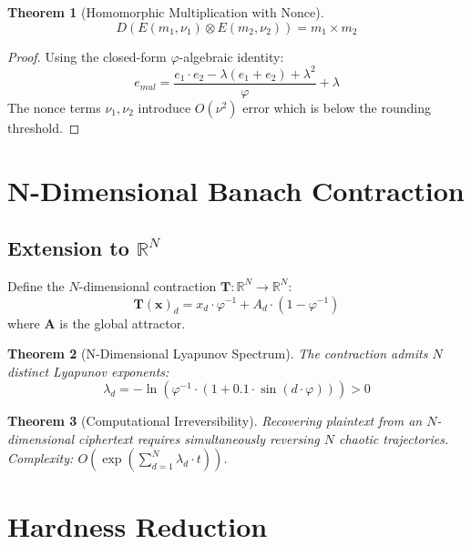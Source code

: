 \documentclass{article}
\newtheorem{theorem}{Theorem}[section]
\begin{document}
\begin{theorem}[Homomorphic Multiplication with Nonce]
\begin{equation}
D(E(m_1, \nu_1) \otimes E(m_2, \nu_2)) = m_1 \times m_2
\end{equation}
\end{theorem}

\begin{proof}
Using the closed-form $\varphi$-algebraic identity:
\begin{equation}
e_{mul} = \frac{e_1 \cdot e_2 - \lambda(e_1 + e_2) + \lambda^2}{\varphi} + \lambda
\end{equation}
The nonce terms $\nu_1, \nu_2$ introduce $O(\nu^2)$ error which is below the rounding threshold.
\end{proof}

\section{N-Dimensional Banach Contraction}

\subsection{Extension to $\mathbb{R}^N$}

Define the $N$-dimensional contraction $\mathbf{T}: \mathbb{R}^N \to \mathbb{R}^N$:
\begin{equation}
\mathbf{T}(\mathbf{x})_d = x_d \cdot \varphi^{-1} + A_d \cdot (1 - \varphi^{-1})
\end{equation}
where $\mathbf{A}$ is the global attractor.

\begin{theorem}[N-Dimensional Lyapunov Spectrum]
The contraction admits $N$ distinct Lyapunov exponents:
\begin{equation}
\lambda_d = -\ln\left(\varphi^{-1} \cdot (1 + 0.1 \cdot \sin(d \cdot \varphi))\right) > 0
\end{equation}
\end{theorem}

\begin{theorem}[Computational Irreversibility]
Recovering plaintext from an $N$-dimensional ciphertext requires simultaneously reversing $N$ chaotic trajectories. Complexity: $O(\exp(\sum_{d=1}^N \lambda_d \cdot t))$.
\end{theorem}

\section{Hardness Reduction}
\end{document}
